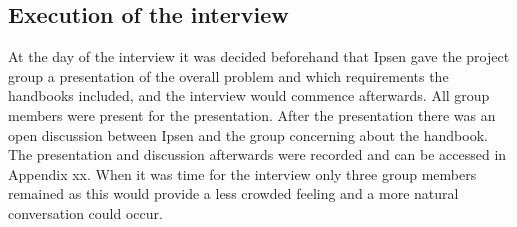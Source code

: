 \subsection{Execution of the interview} \label{sec:firstinterview}

At the day of the interview it was decided beforehand that Ipsen gave the project group a presentation of the overall problem and which requirements the handbooks included, and the interview would commence afterwards.
All group members were present for the presentation.
After the presentation there was an open discussion between Ipsen and the group concerning about the handbook.
The presentation and discussion afterwards were recorded and can be accessed in Appendix xx.
When it was time for the interview only three group members remained as this would provide a less crowded feeling and a more natural conversation could occur.
